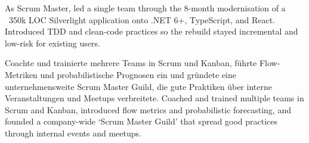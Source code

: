 \begin{cventries}
{\begin{cvitems}
{{				}
				{
					As Scrum Master, led a single team through the 8-month modernisation of a ~350k LOC Silverlight application onto .NET 6+, TypeScript, and React. Introduced TDD and clean-code practices so the rebuild stayed incremental and low-risk for existing users.
				}
			}
			\item {
				{
					Coachte und trainierte mehrere Teams in Scrum und Kanban, führte Flow-Metriken und probabilistische Prognosen ein und gründete eine unternehmensweite \glqq Scrum Master Guild\grqq{}, die gute Praktiken über interne Veranstaltungen und Meetups verbreitete.
				}
				{
					Coached and trained multiple teams in Scrum and Kanban, introduced flow metrics and probabilistic forecasting, and founded a company-wide `Scrum Master Guild' that spread good practices through internal events and meetups.
				}
			}
		\end{cvitems}
	}	
	
	\cventry
	{ 	}
	{  	}
	{  	}
	{  	}
	{  	}
	

\end{cventries}
